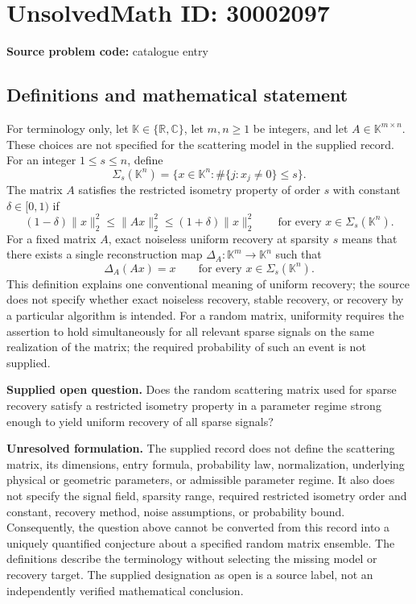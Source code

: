 \documentclass[11pt]{article}
\newcommand{\R}{\mathbb{R}}
\newcommand{\C}{\mathbb{C}}
\begin{document}
\section*{UnsolvedMath ID: 30002097}
\textbf{Source problem code:} catalogue entry
\subsection{Definitions and mathematical statement}
For terminology only, let \(\mathbb K\in\{\R,\C\}\), let \(m,n\geq1\) be integers, and let \(A\in\mathbb K^{m\times n}\). These choices are not specified for the scattering model in the supplied record. For an integer \(1\leq s\leq n\), define
\[
\Sigma_s(\mathbb K^n)=\{x\in\mathbb K^n:\#\{j:x_j\neq0\}\leq s\}.
\]
The matrix \(A\) satisfies the restricted isometry property of order \(s\) with constant \(\delta\in[0,1)\) if
\[
(1-\delta)\|x\|_2^2\leq\|Ax\|_2^2\leq(1+\delta)\|x\|_2^2
\qquad\text{for every }x\in\Sigma_s(\mathbb K^n).
\]
For a fixed matrix \(A\), exact noiseless uniform recovery at sparsity \(s\) means that there exists a single reconstruction map \(\Delta_A:\mathbb K^m\to\mathbb K^n\) such that
\[
\Delta_A(Ax)=x\qquad\text{for every }x\in\Sigma_s(\mathbb K^n).
\]
This definition explains one conventional meaning of uniform recovery; the source does not specify whether exact noiseless recovery, stable recovery, or recovery by a particular algorithm is intended. For a random matrix, uniformity requires the assertion to hold simultaneously for all relevant sparse signals on the same realization of the matrix; the required probability of such an event is not supplied.

\textbf{Supplied open question.} Does the random scattering matrix used for sparse recovery satisfy a restricted isometry property in a parameter regime strong enough to yield uniform recovery of all sparse signals?

\textbf{Unresolved formulation.} The supplied record does not define the scattering matrix, its dimensions, entry formula, probability law, normalization, underlying physical or geometric parameters, or admissible parameter regime. It also does not specify the signal field, sparsity range, required restricted isometry order and constant, recovery method, noise assumptions, or probability bound. Consequently, the question above cannot be converted from this record into a uniquely quantified conjecture about a specified random matrix ensemble. The definitions describe the terminology without selecting the missing model or recovery target. The supplied designation as open is a source label, not an independently verified mathematical conclusion.
\end{document}
